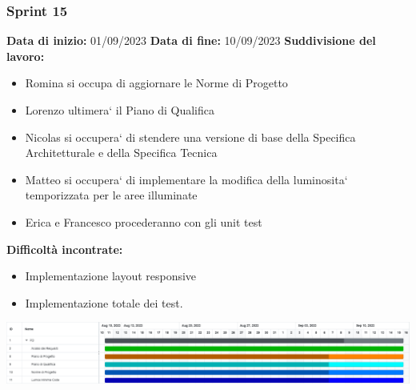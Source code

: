 \documentclass[a4paper, 12pt]{article}
\begin{document}
\subsubsection{Sprint 15}
\textbf{Data di inizio:} 01/09/2023\newline
\textbf{Data di fine:} 10/09/2023\newline
\newline
\textbf{Suddivisione del lavoro:}
\begin{itemize}
	\item Romina si occupa di aggiornare le Norme di Progetto
	\item Lorenzo ultimera` il Piano di Qualifica
	\item Nicolas si occupera` di stendere una versione di base della Specifica Architetturale e della Specifica Tecnica
	\item Matteo si occupera` di implementare la modifica della luminosita` temporizzata per le aree illuminate
	\item Erica e Francesco procederanno con gli unit test
\end{itemize}
\textbf{Difficoltà incontrate:}
\begin{itemize}
	\item Implementazione layout responsive
	\item Implementazione totale dei test.
\end{itemize}
\includegraphics[scale=0.178]{PB_3.png}\newline
\newline
\end{document}
